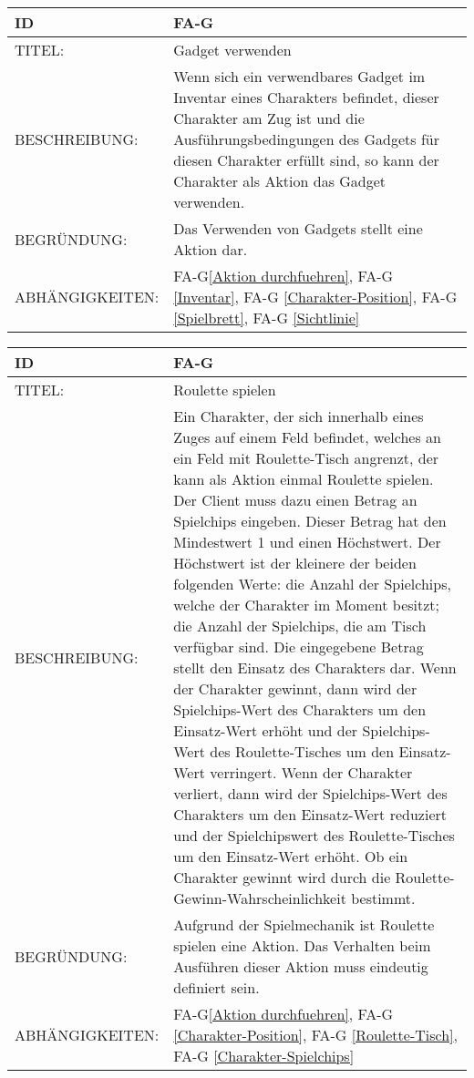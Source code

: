 \begin{tabularx}{16cm}{l|X}
	{table}\label{Gadget verwenden}
	\textbf{ID} & \textbf{FA-G\arabic{table}} \\
	\hline
	TITEL: & Gadget verwenden \\
	\hline
	BESCHREIBUNG: & Wenn sich ein verwendbares Gadget im Inventar eines Charakters befindet, dieser Charakter am Zug ist und die Ausführungsbedingungen des Gadgets für diesen Charakter erfüllt sind, so kann der Charakter als Aktion das Gadget verwenden. \\
	 
	\hline
	BEGRÜNDUNG: & Das Verwenden von Gadgets stellt eine Aktion dar.\\
	\hline
	ABHÄNGIGKEITEN: & FA-G\ref{Aktion durchfuehren}, FA-G \ref{Inventar}, FA-G \ref{Charakter-Position}, FA-G \ref{Spielbrett}, FA-G \ref{Sichtlinie}  \\
\end{tabularx}

\begin{tabularx}{16cm}{l|X}
	{table}\label{Roulette spielen}
	\textbf{ID} & \textbf{FA-G\arabic{table}} \\
	\hline
	TITEL: & Roulette spielen \\
	\hline
	BESCHREIBUNG: & Ein Charakter, der sich innerhalb eines Zuges auf einem Feld befindet, welches an ein Feld mit Roulette-Tisch angrenzt, der kann als Aktion einmal Roulette spielen. Der Client muss dazu einen Betrag an Spielchips eingeben. Dieser Betrag hat den Mindestwert 1 und einen Höchstwert. Der Höchstwert ist der kleinere der beiden folgenden Werte: die Anzahl der Spielchips, welche der Charakter im Moment besitzt; die Anzahl der Spielchips, die am Tisch verfügbar sind. Die eingegebene Betrag stellt den Einsatz des Charakters dar. Wenn der Charakter gewinnt, dann wird der Spielchips-Wert des Charakters um den Einsatz-Wert erhöht und der Spielchips-Wert des Roulette-Tisches um den Einsatz-Wert verringert. Wenn der Charakter verliert, dann wird der Spielchips-Wert des Charakters um den Einsatz-Wert reduziert und der Spielchipswert des Roulette-Tisches um den Einsatz-Wert erhöht. Ob ein Charakter gewinnt wird durch die Roulette-Gewinn-Wahrscheinlichkeit bestimmt.\\
	\hline
	BEGRÜNDUNG: & Aufgrund der Spielmechanik ist Roulette spielen eine Aktion. Das Verhalten beim Ausführen dieser Aktion muss eindeutig definiert sein.\\
	\hline
	ABHÄNGIGKEITEN: & FA-G\ref{Aktion durchfuehren}, FA-G \ref{Charakter-Position}, FA-G \ref{Roulette-Tisch}, FA-G \ref{Charakter-Spielchips} \\
\end{tabularx}

